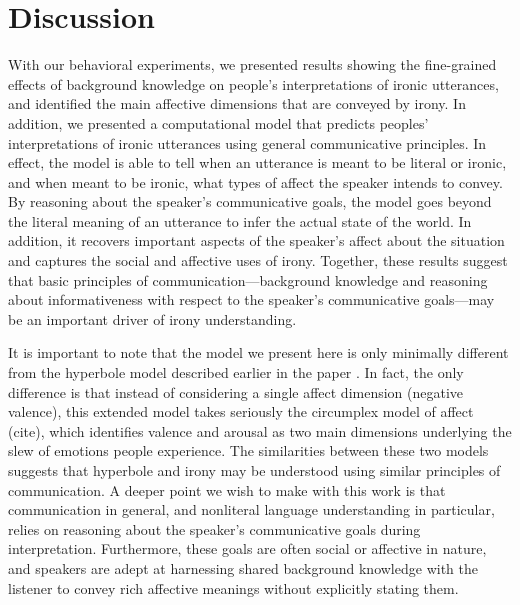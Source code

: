 \documentclass[10pt,letterpaper]{article}
\begin{document}
\section{Discussion}

With our behavioral experiments, we presented results showing the fine-grained effects of background knowledge on people's interpretations of ironic utterances, and identified the main affective dimensions that are conveyed by irony. In addition, we presented a computational model that predicts peoples' interpretations of ironic utterances using general communicative principles. In effect, the model is able to tell when an utterance is meant to be literal or ironic, and when meant to be ironic, what types of affect the speaker intends to convey. By reasoning about the speaker's communicative goals, the model goes beyond the literal meaning of an utterance to infer the actual state of the world. In addition, it recovers important aspects of the speaker's affect about the situation and captures the social and affective uses of irony. Together, these results suggest that basic principles of communication---background knowledge and reasoning about informativeness with respect to the speaker's communicative goals---may be an important driver of irony understanding.

It is important to note that the model we present here is only minimally different from the hyperbole model described earlier in the paper \cite{kao2014nonliteral}. In fact, the only difference is that instead of considering a single affect dimension (negative valence), this extended model takes seriously the circumplex model of affect (cite), which identifies valence and arousal as two main dimensions underlying the slew of emotions people experience. The similarities between these two models suggests that hyperbole and irony may be understood using similar principles of communication. A deeper point we wish to make with this work is that communication in general, and nonliteral language understanding in particular, relies on reasoning about the speaker's communicative goals during interpretation. Furthermore, these goals are often social or affective in nature, and speakers are adept at harnessing shared background knowledge with the listener to convey rich affective meanings without explicitly stating them. 
\end{document}
